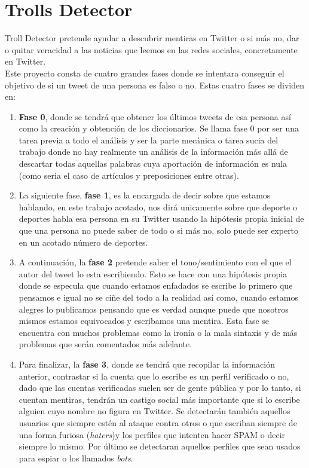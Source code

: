 \documentclass[../all.tex]{subfiles}
\begin{document}
    \section{Trolls Detector}
	
	Troll Detector pretende ayudar a descubrir mentiras en Twitter o si más no, dar o quitar veracidad a las noticias que leemos en las redes sociales, concretamente en Twitter.\\
	
	Este proyecto consta de cuatro grandes fases donde se intentara conseguir el objetivo de si un tweet de una persona es falso o no. Estas cuatro fases se dividen en:
	
	\begin{enumerate}
		\item \textbf{Fase 0}, donde se tendrá que obtener  los últimos tweets de esa persona así como la creación y obtención de los diccionarios. Se llama fase 0 por ser una tarea previa  a todo el análisis y ser la parte mecánica o tarea sucia del trabajo donde no hay realmente un análisis de la información más allá de descartar todas aquellas palabras cuya aportación de información es nula (como seria el caso de artículos y preposiciones entre otras).
		
		\item La siguiente fase, \textbf{fase 1}, es la encargada de decir sobre que estamos hablando, en este trabajo acotado, nos dirá unicamente sobre que deporte o deportes habla esa persona en su Twitter usando la hipótesis propia inicial de que una persona no puede saber de todo o si más no, solo puede ser experto en un acotado número de deportes.
		
		\item A continuación, la \textbf{fase 2} pretende saber el tono/sentimiento con el que el autor del tweet lo esta escribiendo. Esto se hace con una hipótesis propia donde se especula que cuando estamos enfadados se escribe lo primero que pensamos e igual no se ciñe del todo a la realidad así como, cuando estamos alegres lo publicamos pensando que es verdad aunque puede que nosotros mismos estamos equivocados y escribamos una mentira. Esta fase se encuentra con muchos problemas como la ironía o la mala sintaxis y de más problemas que serán comentados más adelante.
		
		\item Para finalizar, la \textbf{fase 3}, donde se tendrá que recopilar la información anterior, contrastar si la cuenta que lo escribe es un perfil verificado o no, dado que las cuentas verificadas suelen ser de gente pública y por lo tanto, si cuentan mentiras, tendrán un castigo social más importante que si lo escribe alguien cuyo nombre no figura en Twitter. Se detectarán también aquellos usuarios que siempre estén al ataque contra otros o que escriban siempre de una forma furiosa (\textit{haters})y los perfiles que intenten hacer SPAM o decir siempre lo mismo. Por último se detectaran aquellos perfiles que sean usados para espiar o los llamados \textit{bots}.
		
	\end{enumerate}
\end{document}
